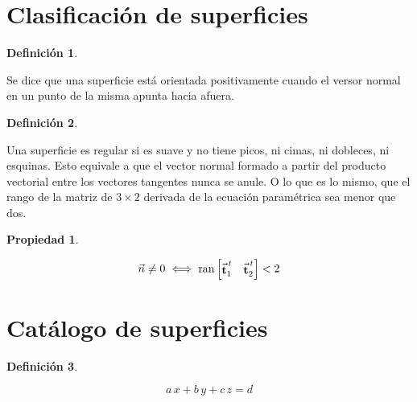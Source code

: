 \documentclass[a5paper,12pt,twoside]{book}
\newtheorem{defn}{{Definición}}[chapter]
\newtheorem{prop}{{Propiedad}}[chapter]
\begin{document}
\section{Clasificación de superficies}

\begin{mdframed}[style=MyFrame1]
    \begin{defn}
    \end{defn}
\end{mdframed}

Se dice que una superficie está orientada positivamente cuando el versor normal en un punto de la misma apunta hacia afuera.

\begin{mdframed}[style=MyFrame1]
    \begin{defn}
    \end{defn}
\end{mdframed}

Una superficie es regular si es suave y no tiene picos, ni cimas, ni dobleces, ni esquinas. Esto equivale a que el vector normal formado a partir del producto vectorial entre los vectores tangentes nunca se anule. O lo que es lo mismo, que el rango de la matriz de $3 \times 2$ derivada de la 
ecuación paramétrica sea menor que dos.

\begin{mdframed}[style=MyFrame1]
    \begin{prop}
    \end{prop}
    \begin{equation*}
        \Vec{n} \neq 0 \iff \operatorname{ran} \begin{bmatrix} \Vec{\textbf{t}}_1^{\,t} & \Vec{\textbf{t}}_2^{\,t} \end{bmatrix} <2
    \end{equation*}
\end{mdframed}


\section{Catálogo de superficies}

\begin{mdframed}[style=MyFrame1]
    \begin{defn}
    \end{defn}
    \begin{equation*}
        a\,x +b\,y +c\,z = d
    \end{equation*}
\end{mdframed}
\end{document}

